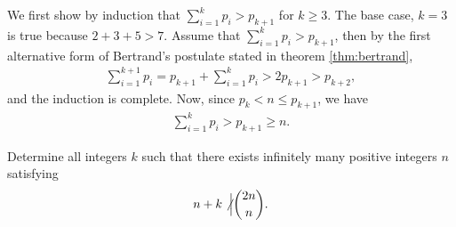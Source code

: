 \documentclass{subfile}
\begin{document}
	\begin{solution}
		We first show by induction that $\sum_{i=1}^{k} p_i > p_{k+1}$ for $k \geq 3$. The base case, $k=3$ is true because $2+3+5>7$. Assume that $\sum_{i=1}^{k} p_i > p_{k+1}$, then by the first alternative form of Bertrand's postulate stated in theorem \autoref{thm:bertrand},
			\begin{align*}
				\sum_{i=1}^{k+1} p_i = p_{k+1} + \sum_{i=1}^k p_i > 2p_{k+1} > p_{k+2},
			\end{align*}
		and the induction is complete. Now, since $p_k<n\leq p_{k+1}$, we have
			\begin{align*}
				\sum_{i=1}^k p_i > p_{k+1} \geq n.
			\end{align*}
	\end{solution}

	\begin{problem}[China 2015]\label{prob:china2015-bertrand}
		Determine all integers $k$ such that there exists infinitely many positive integers $n$ satisfying
		\begin{align*}
		n+k \not \Big| \binom{2n}{n}.
		\end{align*}
	\end{problem}
\end{document}
